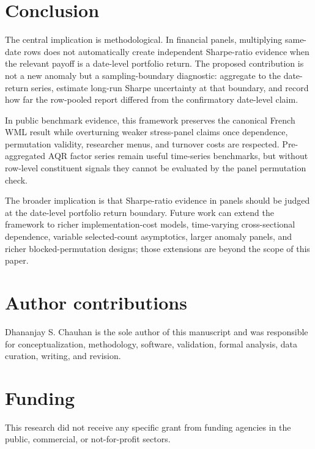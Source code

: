 \documentclass[12pt,a4paper]{article}
\newif\ifblinded
\begin{document}
\section{Conclusion}

The central implication is methodological.  In financial panels,
multiplying same-date rows does not automatically create independent
Sharpe-ratio evidence when the relevant payoff is a date-level portfolio
return.  The proposed contribution is not a new anomaly but a
sampling-boundary diagnostic: aggregate to the date-return series,
estimate long-run Sharpe uncertainty at that boundary, and record how far
the row-pooled report differed from the confirmatory date-level claim.

In public benchmark evidence, this framework preserves the canonical
French WML result while overturning weaker stress-panel claims once
dependence, permutation validity, researcher menus, and turnover costs
are respected.  Pre-aggregated AQR factor series remain useful
time-series benchmarks, but without row-level constituent signals they
cannot be evaluated by the panel permutation check.

The broader implication is that Sharpe-ratio evidence in panels should be
judged at the date-level portfolio return boundary.  Future
work can extend the framework to richer implementation-cost models,
time-varying cross-sectional dependence, variable selected-count
asymptotics, larger anomaly panels, and richer blocked-permutation
designs; those extensions are beyond the scope of this paper.

\section*{Author contributions}

\ifblinded
The author was responsible for conceptualization, methodology, software,
validation, formal analysis, data curation, writing, and revision.
\else
Dhananjay S. Chauhan is the sole author of this manuscript and was
responsible for conceptualization, methodology, software, validation,
formal analysis, data curation, writing, and revision.
\fi

\section*{Funding}

This research did not receive any specific grant from funding agencies in
the public, commercial, or not-for-profit sectors.
\end{document}
